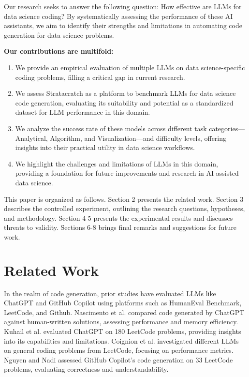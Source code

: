 \documentclass[conference]{IEEEtran}
\begin{document}
Our research seeks to answer the following question: How effective are LLMs for data science coding? By systematically assessing the performance of these AI assistants, we aim to identify their strengths and limitations in automating code generation for data science problems.

\textbf{Our contributions are multifold:} \begin{enumerate} \item We provide an empirical evaluation of multiple LLMs on data science-specific coding problems, filling a critical gap in current research. \item We assess Stratacratch as a platform to benchmark LLMs for data science code generation, evaluating its suitability and potential as a standardized dataset for LLM performance in this domain. \item We analyze the success rate of these models across different task categories—Analytical, Algorithm, and Visualization—and difficulty levels, offering insights into their practical utility in data science workflows. \item We highlight the challenges and limitations of LLMs in this domain, providing a foundation for future improvements and research in AI-assisted data science. \end{enumerate}

This paper is organized as follows. Section 2 presents the related work. Section 3 describes the controlled experiment, outlining the research questions, hypotheses, and methodology. Section 4-5 presents the experimental results and discusses threats to validity. Sections 6-8 brings final remarks and suggestions for future work.


\section{Related Work}

In the realm of code generation, prior studies have evaluated LLMs like ChatGPT and GitHub Copilot using platforms such as HumanEval Benchmark, LeetCode, and Github. Nascimento et al. \cite{nathalia2023artificial} compared code generated by ChatGPT against human-written solutions, assessing performance and memory efficiency. Kuhail et al. \cite{kuhail2024will} evaluated ChatGPT on 180 LeetCode problems, providing insights into its capabilities and limitations. Coignion et al. \cite{coignion2024performance} investigated different LLMs on general coding problems from LeetCode, focusing on performance metrics. Nguyen and Nadi \cite{nguyen2022empirical} assessed GitHub Copilot's code generation on 33 LeetCode problems, evaluating correctness and understandability.
\end{document}
